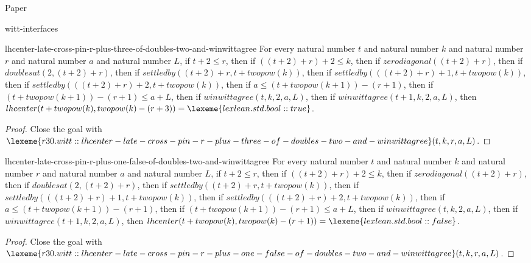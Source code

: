 \begin{lexlean}{Paper}
\begin{section}{witt-interfaces}
  \begin{theorem}{lhcenter-late-cross-pin-r-plus-three-of-doubles-two-and-winwittagree}
  For every natural number \(t\) and natural number \(k\) and natural number \(r\) and natural number \(a\) and natural number \(L\), if \(t + 2 ≤ r\), then if \(((t + 2) + r) + 2 ≤ k\), then if \(zerodiagonal((t + 2) + r)\), then if \(doublesat(2, (t + 2) + r)\), then if \(settledby((t + 2) + r, t + twopow(k))\), then if \(settledby(((t + 2) + r) + 1, t + twopow(k))\), then if \(settledby(((t + 2) + r) + 2, t + twopow(k))\), then if \(a ≤ (t + twopow(k + 1)) - (r + 1)\), then if \((t + twopow(k + 1)) - (r + 1) ≤ a + L\), then if \(winwittagree(t, k, 2, a, L)\), then if \(winwittagree(t + 1, k, 2, a, L)\), then \(lhcenter(t + twopow(k), twopow(k) - (r + 3)) = \lexeme{lexlean.std.bool::true}\).
  \begin{proof}
  Close the goal with \(\lexeme{r30.witt::lhcenter-late-cross-pin-r-plus-three-of-doubles-two-and-winwittagree}(t, k, r, a, L)\).
  \end{proof}
  \end{theorem}

  \begin{theorem}{lhcenter-late-cross-pin-r-plus-one-false-of-doubles-two-and-winwittagree}
  For every natural number \(t\) and natural number \(k\) and natural number \(r\) and natural number \(a\) and natural number \(L\), if \(t + 2 ≤ r\), then if \(((t + 2) + r) + 2 ≤ k\), then if \(zerodiagonal((t + 2) + r)\), then if \(doublesat(2, (t + 2) + r)\), then if \(settledby((t + 2) + r, t + twopow(k))\), then if \(settledby(((t + 2) + r) + 1, t + twopow(k))\), then if \(settledby(((t + 2) + r) + 2, t + twopow(k))\), then if \(a ≤ (t + twopow(k + 1)) - (r + 1)\), then if \((t + twopow(k + 1)) - (r + 1) ≤ a + L\), then if \(winwittagree(t, k, 2, a, L)\), then if \(winwittagree(t + 1, k, 2, a, L)\), then \(lhcenter(t + twopow(k), twopow(k) - (r + 1)) = \lexeme{lexlean.std.bool::false}\).
  \begin{proof}
  Close the goal with \(\lexeme{r30.witt::lhcenter-late-cross-pin-r-plus-one-false-of-doubles-two-and-winwittagree}(t, k, r, a, L)\).
  \end{proof}
  \end{theorem}


\end{section}
\end{lexlean}
